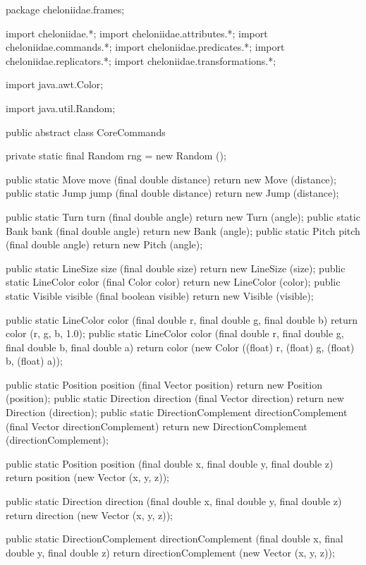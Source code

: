 \documentclass{report}
\begin{document}
\begin{javacode}
package cheloniidae.frames;

import cheloniidae.*;
import cheloniidae.attributes.*;
import cheloniidae.commands.*;
import cheloniidae.predicates.*;
import cheloniidae.replicators.*;
import cheloniidae.transformations.*;

import java.awt.Color;

import java.util.Random;

public abstract class CoreCommands {
  private static final Random rng = new Random ();

  public static Move move (final double distance) {return new Move (distance);}
  public static Jump jump (final double distance) {return new Jump (distance);}

  public static Turn  turn  (final double angle) {return new Turn (angle);}
  public static Bank  bank  (final double angle) {return new Bank (angle);}
  public static Pitch pitch (final double angle) {return new Pitch (angle);}

  public static LineSize  size    (final double size)     {return new LineSize (size);}
  public static LineColor color   (final Color color)     {return new LineColor (color);}
  public static Visible   visible (final boolean visible) {return new Visible (visible);}

  public static LineColor color   (final double r, final double g, final double b)
    {return color (r, g, b, 1.0);}
  public static LineColor color   (final double r, final double g, final double b, final double a)
    {return color (new Color ((float) r, (float) g, (float) b, (float) a));}

  public static Position  position  (final Vector position)  {return new Position (position);}
  public static Direction direction (final Vector direction) {return new Direction (direction);}
  public static DirectionComplement directionComplement (final Vector directionComplement)
    {return new DirectionComplement (directionComplement);}

  public static Position  position  (final double x, final double y, final double z)
    {return position  (new Vector (x, y, z));}

  public static Direction direction (final double x, final double y, final double z) 
    {return direction (new Vector (x, y, z));}

  public static DirectionComplement directionComplement (final double x, final double y, final double z)
    {return directionComplement (new Vector (x, y, z));}

}
\end{javacode}
\end{document}
